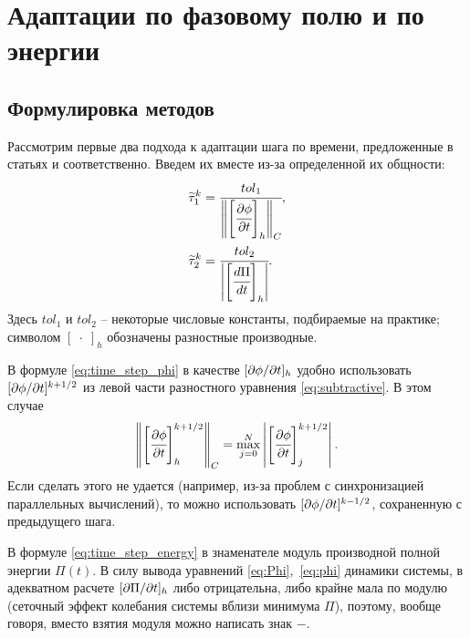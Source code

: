 
\section{Адаптации по фазовому полю и по энергии}

\subsection{Формулировка методов}

Рассмотрим первые два подхода к адаптации шага по времени, предложенные в статьях \cite{li_time_step} и \cite{zhang_time_step} соответственно. Введем их вместе из-за определенной их общности:
\begin{align}
	\widetilde{\tau}_1^k & = \cfrac{tol_1}{\left\| \left[ \cfrac{\partial \phi}{\partial t} \right]_h \right\|_C},
	\label{eq:time_step_phi} \\
	\widetilde{\tau}_2^k & = \cfrac{tol_2}{\left| \left[ \cfrac{d \Pi}{dt} \right]_h \right|}.
	\label{eq:time_step_energy}
\end{align}
Здесь $tol_1$ и $tol_2$ -- некоторые числовые константы, подбираемые на практике; символом $[\; \cdot \;]_h$ обозначены разностные производные.

В формуле \eqref{eq:time_step_phi} в качестве $[\partial \phi / \partial t]_h$ удобно использовать $[\partial \phi / \partial t]^{k + 1/2}$ из левой части разностного уравнения \eqref{eq:subtractive}. В этом случае
\[
	\left\| \left[ \cfrac{\partial \phi}{\partial t} \right]_h^{k + 1/2} \right\|_C = \max\limits_{j = 0}^N \left| \left[ \cfrac{\partial \phi}{\partial t} \right]_j^{k + 1/2} \right|.
\]
Если сделать этого не удается (например, из-за проблем с синхронизацией параллельных вычислений), то можно использовать $[\partial \phi / \partial t]^{k - 1/2}$, сохраненную с предыдущего шага.

В формуле \eqref{eq:time_step_energy} в знаменателе модуль производной полной энергии $\Pi(t)$. В силу вывода уравнений \eqref{eq:Phi},~\eqref{eq:phi} динамики системы, в адекватном расчете $[\partial \Pi / \partial t]_h$ либо отрицательна, либо крайне мала по модулю (сеточный эффект колебания системы вблизи минимума $\Pi$), поэтому, вообще говоря, вместо взятия модуля можно написать знак $-$.

